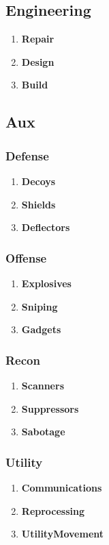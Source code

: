 \subsection{Engineering}\label{subsec:engineering}
\begin{enumerate}[label= -]
    \item \textbf{Repair} 
    \item \textbf{Design} 
    \item \textbf{Build} 
\end{enumerate}
\subsection{Aux}\label{subsec:aux}
\subsubsection{Defense}
\begin{enumerate}[label= -]
    \item \textbf{Decoys}
    \item \textbf{Shields}
    \item \textbf{Deflectors}
\end{enumerate}
\subsubsection{Offense}
\begin{enumerate}[label= -]
    \item \textbf{Explosives}
    \item \textbf{Sniping}
    \item \textbf{Gadgets}
\end{enumerate}
\subsubsection{Recon}
\begin{enumerate}[label= -]
    \item \textbf{Scanners}
    \item \textbf{Suppressors}
    \item \textbf{Sabotage}
\end{enumerate}
\subsubsection{Utility}
\begin{enumerate}[label= -]
    \item \textbf{Communications}
    \item \textbf{Reprocessing}
    \item \textbf{UtilityMovement}
\end{enumerate}
